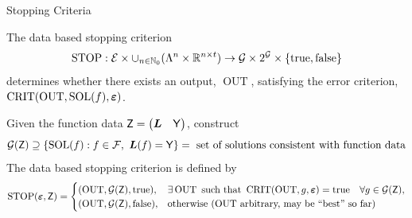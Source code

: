 \documentclass[10pt,compress,xcolor={usenames,dvipsnames},aspectratio=169]{beamer}
\DeclareMathOperator{\STOP}{STOP}
\DeclareMathOperator{\SOL}{SOL}
\DeclareMathOperator{\OUT}{OUT}
\DeclareMathOperator{\CRIT}{CRIT}
\newcommand{\ttrue}{\textup{true}}
\newcommand{\tfalse}{\textup{false}}
\begin{document}
\begin{frame}{Stopping Criteria}

\vspace{-5ex}
The \alert{data based} stopping criterion
\[
\STOP:  \ce  \times \cup_{n \in \natzero} (\Lambda^n \times \reals^{n\times t} ) \to \cg \times 2^\cg \times \{\ttrue, \tfalse \}
\]
determines whether there exists an output, $\OUT$, satisfying the error criterion, $\CRIT(\OUT,\SOL(f),\veps)$.   

Given the function data $\mathsf{Z} =\begin{pmatrix}\boldsymbol{L} & \mathsf{Y}\end{pmatrix}$,  construct 
\[
\cg(\mZ) \supseteq \{\SOL(f) :   f \in \cf, \ \vL(f) = \mY   \} = \text{ set of solutions consistent with function data}
\]
The data based stopping criterion is defined by
\[
\STOP(\veps,\mZ) = \begin{cases} 
	(\OUT,\cg(\mZ), \ttrue), & 
	\exists \OUT \text{ such that } \CRIT(\OUT,g,\veps) = \ttrue \quad \forall g \in \cg(\mZ), \\
	(\OUT,\cg(\mZ),\tfalse), & \text{otherwise ($\OUT$ arbitrary, may be ``best'' so far)}
	\end{cases}
\]

\end{frame}
\end{document}
